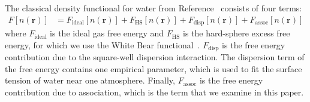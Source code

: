 \documentclass[twocolumn,amsmath,amssymb,prl]{revtex4-1}
\newcommand{\rr}{\textbf{r}}
\begin{document}
The classical density functional for water from
Reference~ consists of four terms:
\begin{align}
  F[n(\rr)] &= F_{\text{ideal}}[n(\rr)] + F_{\text{HS}}[n(\rr)]
  + F_{\text{disp}}[n(\rr)] + F_{\text{assoc}}[n(\rr)]
\end{align}
where $F_{\text{ideal}}$ is the ideal gas free energy and
$F_{\text{HS}}$ is the hard-sphere excess free energy, for which we
use the White Bear functional~\cite{roth2002whitebear}.
$F_{\text{disp}}$ is the free energy contribution due to the
square-well dispersion interaction.  The dispersion term of the free
energy contains one empirical parameter, which is used to fit the
surface tension of water near one atmosphere.  Finally,
$F_{\text{assoc}}$ is the free energy contribution due to association,
which is the term that we examine in this paper.
\end{document}
